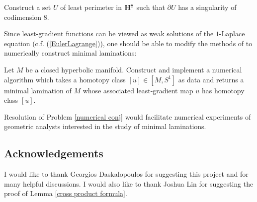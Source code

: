 \begin{problem}
    Construct a set $U$ of least perimeter in $\mathbf H^8$ such that $\partial U$ has a singularity of codimension $8$.
\end{problem}

Since least-gradient functions can be viewed as weak solutions of the $1$-Laplace equation (c.f. (\ref{EulerLagrange})), one should be able to modify the methods of \cite{Loisel20} to numerically construct minimal laminations:

\begin{problem}\label{numerical conj}
    Let $M$ be a closed hyperbolic manifold.
    Construct and implement a numerical algorithm which takes a homotopy class $[u] \in [M, S^1]$ as data and returns a minimal lamination of $M$ whose associated least-gradient map $u$ has homotopy class $[u]$.
\end{problem}

Resolution of Problem \ref{numerical conj} would facilitate numerical experiments of geometric analysts interested in the study of minimal laminations. 


\subsection{Acknowledgements}
I would like to thank Georgios Daskalopoulos for suggesting this project and for many helpful discussions.
I would also like to thank Joshua Lin for suggesting the proof of Lemma \ref{cross product formula}.

